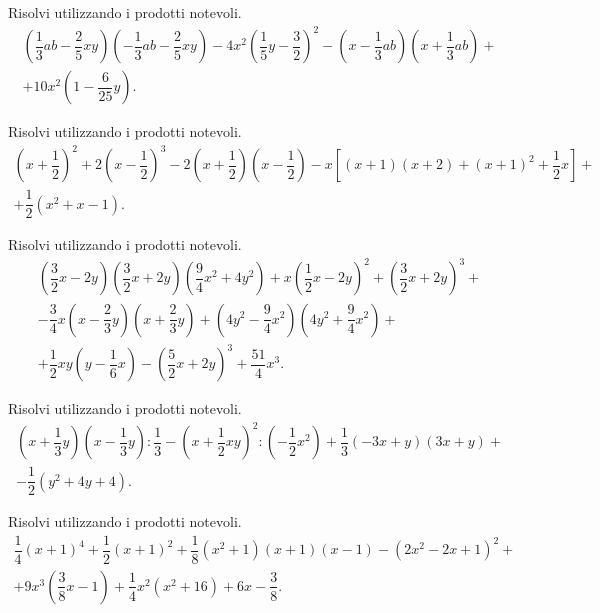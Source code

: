\begin{esercizio}[\Ast]
Risolvi utilizzando i prodotti notevoli.
\begin{multline*}
\left(\dfrac{1}{3}{ab}-\dfrac{2}{5}{xy}\right)\left(-{\dfrac{1}{3}}{ab}-\dfrac{2}{5}{xy}\right)-4x^{2}\left(\dfrac{1}{5}y-\dfrac{3}{2}\right)^{2}-\left(x-\dfrac{1}{3}{ab}\right)\left(x+\dfrac{1}{3}{ab}\right)+\\
+10x^{2}\left(1-\dfrac{6}{25}y\right).
\end{multline*}
\end{esercizio}

\begin{esercizio}[\Ast]
Risolvi utilizzando i prodotti notevoli.
\begin{multline*}
\left(x+\dfrac{1}{2}\right)^{2}+2\left(x-\dfrac{1}{2}\right)^{3}-2\left(x+\dfrac{1}{2}\right)\left(x-\dfrac{1}{2}\right)-x\left[(x+1)(x+2)+(x+1)^{2}+\dfrac{1}{2}x\right]+\\
+\dfrac{1}{2}\left(x^{2}+x-1\right).
\end{multline*}
\end{esercizio}

\begin{esercizio}[\Ast]
Risolvi utilizzando i prodotti notevoli.
\begin{multline*}
\left(\dfrac{3}{2}x-2y\right)\left(\dfrac{3}{2}x+2y\right)\left(\dfrac{9}{4}x^{2}+4y^{2}\right)+x\left(\dfrac{1}{2}x-2y\right)^{2}+\left(\dfrac{3}{2}x+2y\right)^{3}+\\
-\dfrac{3}{4}x\left(x-\dfrac{2}{3}y\right)\left(x+\dfrac{2}{3}y\right)+\left(4y^{2}-\dfrac{9}{4}x^{2}\right)\left(4y^{2}+\dfrac{9}{4}x^{2}\right)+\\
+\dfrac{1}{2}{xy}\left(y-\dfrac{1}{6}x\right)-\left(\dfrac{5}{2}x+2y\right)^{3}+\dfrac{51}{4}x^{3}.
\end{multline*}
\end{esercizio}

\begin{esercizio}[\Ast]
Risolvi utilizzando i prodotti notevoli.
\begin{multline*}
\left(x+\dfrac{1}{3}y\right)\left(x-\dfrac{1}{3}y\right):\dfrac{1}{3}-\left(x+\dfrac{1}{2}{xy}\right)^{2}:\left(-{\dfrac{1}{2}}x^2\right)+\dfrac{1}{3}(-3x+y)(3x+y)+\\
-\dfrac{1}{2}\left(y^{2}+4y+4\right).
\end{multline*}
\end{esercizio}

\begin{esercizio}[\Ast]
Risolvi utilizzando i prodotti notevoli.
\begin{multline*}
\dfrac{1}{4}(x+1)^{4}+\dfrac{1}{2}(x+1)^{2}+\dfrac{1}{8}\left(x^{2}+1\right)(x+1)(x-1)-\left(2x^{2}-2x+1\right)^{2}+\\
+9x^{3}\left(\dfrac{3}{8}x-1\right)+\dfrac{1}{4}x^{2}\left(x^{2}+16\right)+6x-\dfrac{3}{8}.
\end{multline*}
\end{esercizio}

